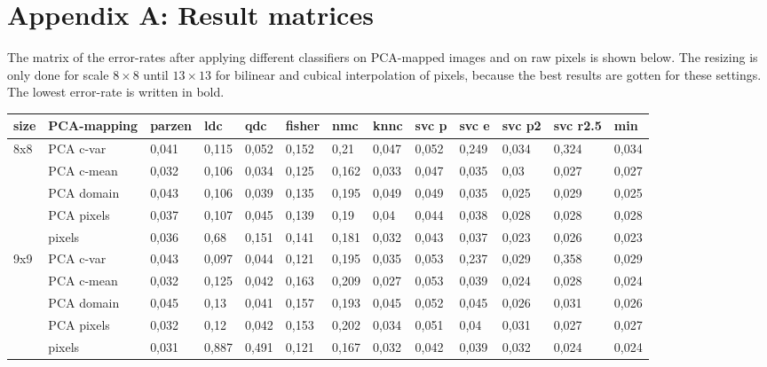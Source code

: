 \documentclass{article}
\begin{document}
\clearpage

\section{Appendix A: Result matrices}

The matrix of the error-rates after applying different classifiers on PCA-mapped images and on raw pixels is shown below. The resizing is only done for scale $8 \times 8$ until $13 \times 13$ for bilinear and cubical interpolation of pixels, because the best results are gotten for these settings. The lowest error-rate is written in bold.

\begin{table}[H]
  \small
  \centering
    \begin{tabular}{l|l|llllllllll|l|}
    \hline
    \textbf{size} & \textbf{PCA-mapping} & \textbf{parzen} & \textbf{ldc} & \textbf{qdc} & \textbf{fisher} & \textbf{nmc} & \textbf{knnc} & \textbf{svc p} & \textbf{svc e} & \textbf{svc p2} & \textbf{svc r2.5} & \textbf{min} \\
    \hline \hline
    8x8   & PCA c-var & 0,041 & 0,115 & 0,052 & 0,152 & 0,21  & 0,047 & 0,052 & 0,249 & 0,034 & 0,324 & 0,034 \\
          & PCA c-mean & 0,032 & 0,106 & 0,034 & 0,125 & 0,162 & 0,033 & 0,047 & 0,035 & 0,03  & 0,027 & 0,027 \\
          & PCA domain & 0,043 & 0,106 & 0,039 & 0,135 & 0,195 & 0,049 & 0,049 & 0,035 & 0,025 & 0,029 & 0,025 \\
          & PCA pixels & 0,037 & 0,107 & 0,045 & 0,139 & 0,19  & 0,04  & 0,044 & 0,038 & 0,028 & 0,028 & 0,028 \\
          & pixels & 0,036 & 0,68  & 0,151 & 0,141 & 0,181 & 0,032 & 0,043 & 0,037 & 0,023 & 0,026 & 0,023 \\ \hline
    9x9   & PCA c-var & 0,043 & 0,097 & 0,044 & 0,121 & 0,195 & 0,035 & 0,053 & 0,237 & 0,029 & 0,358 & 0,029 \\
          & PCA c-mean & 0,032 & 0,125 & 0,042 & 0,163 & 0,209 & 0,027 & 0,053 & 0,039 & 0,024 & 0,028 & 0,024 \\
          & PCA domain & 0,045 & 0,13  & 0,041 & 0,157 & 0,193 & 0,045 & 0,052 & 0,045 & 0,026 & 0,031 & 0,026 \\
          & PCA pixels & 0,032 & 0,12  & 0,042 & 0,153 & 0,202 & 0,034 & 0,051 & 0,04  & 0,031 & 0,027 & 0,027 \\
          & pixels & 0,031 & 0,887 & 0,491 & 0,121 & 0,167 & 0,032 & 0,042 & 0,039 & 0,032 & 0,024 & 0,024 \\ \hline

\end{tabular}
\end{table}
\end{document}
